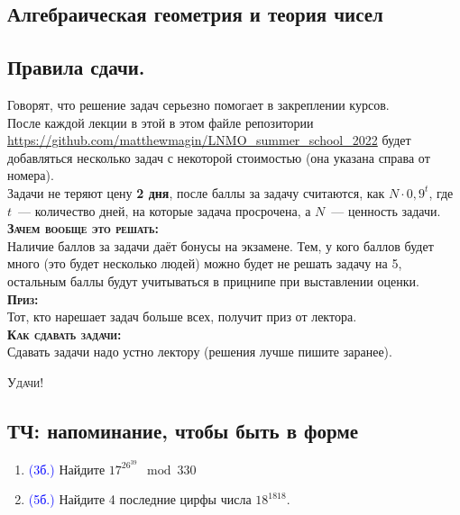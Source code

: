 \documentclass[11pt]{article}
\begin{document}
\begin{center}
        \section*{Алгебраическая геометрия и теория чисел}
    \end{center}
    \tableofcontents
    \newpage
    \subsection*{Правила сдачи.}

    Говорят, что решение задач серьезно помогает в закреплении курсов. \\

    После каждой лекции в этой в этом файле  репозитории \url{https://github.com/matthewmagin/LNMO_summer_school_2022}
    будет добавляться несколько задач с некоторой стоимостью (она указана справа от номера).\\

    Задачи не теряют цену \textbf{2 дня}, после баллы за задачу считаются, как $N \cdot 0,9^{t}$, где
    $t$~--- количество дней, на которые задача просрочена, а $N$~--- ценность задачи. \\

    \textbf{\textsc{Зачем вообще это решать:}}\\
    Наличие баллов за задачи даёт бонусы на экзамене. Тем, у кого баллов будет много
    (это будет несколько людей) можно будет не решать задачу на 5, остальным баллы будут учитываться в прицнипе при выставлении оценки.\\

    \textbf{\textsc{Приз:}}\\
    Тот, кто нарешает задач больше всех, получит приз от лектора.\\

    \textbf{\textsc{Как сдавать задачи:}}\\
    Сдавать задачи надо устно лектору (решения лучше пишите заранее).

    \begin{center}
        \textsc{Удачи!}
    \end{center}
    \newpage

    \subsection*{ТЧ: напоминание, чтобы быть в форме}
    \begin{enumerate}[start=1,label={\bfseries \arabic*.}]
        \item \textcolor{blue}{(3б.)} Найдите $17^{26^{39}} \mod{330}$

        \item \textcolor{blue}{(5б.)} Найдите 4 последние цирфы числа $18^{1818}$.

    \end{enumerate}
\end{document}
